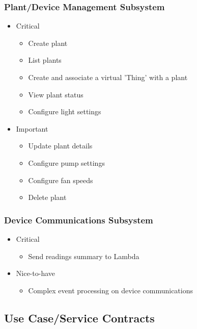 \documentclass{article}
\begin{document}
		\subsubsection{Plant/Device Management Subsystem}
			\begin{itemize}
				\item Critical
				\begin{itemize}
					\item Create plant
					\item List plants
					\item Create and associate a virtual 'Thing' with a plant
					\item View plant status
					\item Configure light settings
				\end{itemize}
				
				\item Important
				\begin{itemize}
					\item Update plant details
					\item Configure pump settings
					\item Configure fan speeds
					\item Delete plant
				\end{itemize}
			\end{itemize}
		
		\subsubsection{Device Communications Subsystem}
			\begin{itemize}
				\item Critical
				\begin{itemize}
					\item Send readings summary to Lambda
				\end{itemize}
				
				\item Nice-to-have
				\begin{itemize}
					\item Complex event processing on device communications
				\end{itemize}
			\end{itemize}
			
\newpage

\subsection{Use Case/Service Contracts}
\end{document}
